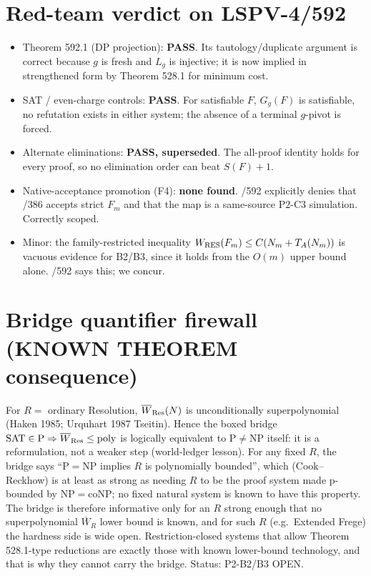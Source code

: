\documentclass[11pt]{article}
\begin{document}
\section*{Red-team verdict on LSPV-4/592}
\begin{itemize}
\item Theorem 592.1 (DP projection): \textbf{PASS}. Its tautology/duplicate argument is correct because $g$ is fresh
and $L_g$ is injective; it is now implied in strengthened form by Theorem 528.1 for minimum cost.
\item SAT / even-charge controls: \textbf{PASS}. For satisfiable $F$, $G_g(F)$ is satisfiable, no refutation exists in
either system; the absence of a terminal $g$-pivot is forced.
\item Alternate eliminations: \textbf{PASS, superseded}. The all-proof identity holds for every proof, so no
elimination order can beat $S(F)+1$.
\item Native-acceptance promotion (F4): \textbf{none found}. /592 explicitly denies that /386 accepts strict $F_m$ and
that the map is a same-source P2-C3 simulation. Correctly scoped.
\item Minor: the family-restricted inequality $W_{\rm RES}(F_m)\le C(N_m+T_A(N_m))$ is vacuous evidence for B2/B3,
since it holds from the $O(m)$ upper bound alone. /592 says this; we concur.
\end{itemize}

\section*{Bridge quantifier firewall (KNOWN THEOREM consequence)}
For $R=$ ordinary Resolution, $\overline W_{\rm Res}(N)$ is unconditionally superpolynomial (Haken 1985; Urquhart 1987
Tseitin). Hence the boxed bridge $\mathrm{SAT}\in\mathrm P\Rightarrow\overline W_{\rm Res}\le\mathrm{poly}$ is
logically equivalent to $\mathrm P\neq\mathrm{NP}$ itself: it is a reformulation, not a weaker step (world-ledger
lesson). For any fixed $R$, the bridge says ``$\mathrm P=\mathrm{NP}$ implies $R$ is polynomially bounded'', which
(Cook--Reckhow) is at least as strong as needing $R$ to be the proof system made p-bounded by $\mathrm{NP}=\mathrm{coNP}$;
no fixed natural system is known to have this property. The bridge is therefore informative only for an $R$ strong
enough that no superpolynomial $\overline W_R$ lower bound is known, and for such $R$ (e.g.\ Extended Frege) the
hardness side is wide open. Restriction-closed systems that allow Theorem 528.1-type reductions are exactly those with
known lower-bound technology, and that is why they cannot carry the bridge. Status: P2-B2/B3 OPEN.
\end{document}
